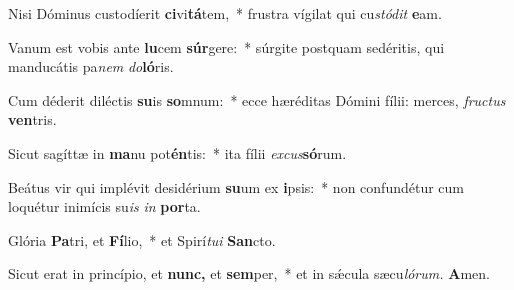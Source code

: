 \item Nisi Dóminus custodíerit \textbf{ci}vi\textbf{tá}tem,~* frustra vígilat qui cu\hspace{0.03em}\textit{stódit} \textbf{e}am.
\item Vanum est vobis ante \textbf{lu}cem \textbf{súr}gere:~* súrgite postquam sedéritis, qui manducátis pa\hspace{0.03em}\textit{nem} \textit{do}\textbf{ló}ris.
\item Cum déderit diléctis \textbf{su}is \textbf{so}mnum:~* ecce hæréditas Dómini fílii: merces, \textit{fru\-ctus} \textbf{ven}tris.
\item Sicut sagíttæ in \textbf{ma}nu pot\textbf{én}tis:~* ita fílii \textit{excus}\textbf{só}rum.
\item Beátus vir qui implévit desidérium \textbf{su}um ex \textbf{i}psis:~* non confundétur cum loquétur inimícis su\hspace{0.03em}\textit{is} \textit{in} \textbf{por}ta.
\item Glória \textbf{Pa}tri, et \textbf{Fí}lio,~* et Spirí\hspace{0.03em}\textit{tu}\textit{i} \textbf{San}cto.
\item Sicut erat in princípio, et \textbf{nunc,} et \textbf{sem}per,~* et in sǽcula sæcu\hspace{0.03em}\textit{lórum.} \textbf{A}men.
